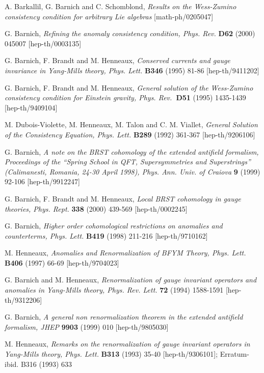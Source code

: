 \documentclass[a4paper,12pt]{article}
\begin{document}
\begin{thebibliography}{99}
  A. Barkallil, G. Barnich and C. Schomblond, \textit{Results
on the Wess-Zumino consistency condition for arbitrary Lie algebras}
[math-ph/0205047]

  G. Barnich, \textit{Refining the anomaly consistency
condition, Phys. Rev.} \textbf{D62} (2000) 045007 [hep-th/0003135]

  G. Barnich, F. Brandt and M. Henneaux, \textit{Conserved
currents and gauge invariance in Yang-Mills theory, Phys. Lett.} \textbf{B346%
} (1995) 81-86 [hep-th/9411202]

  G. Barnich, F. Brandt and M. Henneaux, \textit{General
solution of the Wess-Zumino consistency condition for Einstein gravity,
Phys. Rev.}\textbf{\ D51} (1995) 1435-1439 [hep-th/9409104]

  M. Dubois-Violette, M. Henneaux, M. Talon and C. M.
Viallet, \textit{General Solution of the Consistency Equation, Phys. Lett.} 
\textbf{B289} (1992) 361-367 [hep-th/9206106]

  G. Barnich, \textit{A note on the BRST cohomology of the
extended antifield formalism, Proceedings of the ``Spring School in QFT,
Supersymmetries and Superstrings'' (Calimanesti, Romania, 24-30 April 1998),
Phys. Ann. Univ. of Craiova} \textbf{9} (1999) 92-106 [hep-th/9912247]

  G. Barnich, F. Brandt and M. Henneaux, \textit{Local BRST
cohomology in gauge theories, Phys. Rept.} \textbf{338} (2000) 439-569
[hep-th/0002245]

  G. Barnich, \textit{Higher order cohomological
restrictions on anomalies and counterterms, Phys. Lett.} \textbf{B419}
(1998) 211-216 [hep-th/9710162]

  M. Henneaux, \textit{Anomalies and Renormalization of BFYM
Theory, Phys. Lett.} \textbf{B406} (1997) 66-69 [hep-th/9704023]

  G. Barnich and M. Henneaux, \textit{Renormalization of
gauge invariant operators and anomalies in Yang-Mills theory, Phys. Rev.
Lett.} \textbf{72} (1994) 1588-1591 [hep-th/9312206]

  G. Barnich, \textit{A general non renormalization theorem
in the extended antifield formalism, JHEP} \textbf{9903} (1999) 010
[hep-th/9805030]

  M. Henneaux, \textit{Remarks on the renormalization of
gauge invariant operators in Yang-Mills theory, Phys. Lett.} \textbf{B313}
(1993) 35-40 [hep-th/9306101]; Erratum-ibid. B316 (1993) 633


\end{thebibliography}
\end{document}
